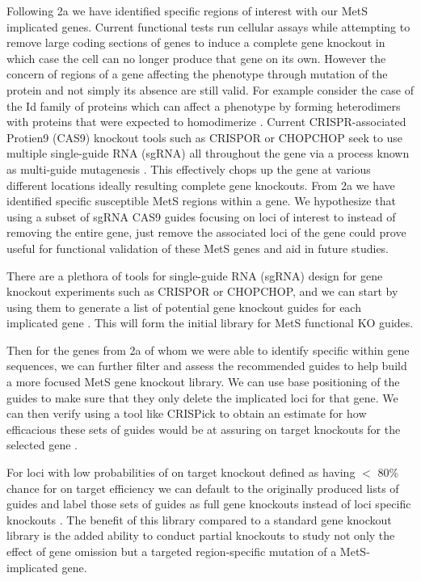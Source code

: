 \documentclass[11pt]{article}
\begin{document}
\noindent {}

Following 2a we have identified specific regions of interest with our MetS implicated genes. Current functional tests run cellular assays while attempting to remove large coding sections of genes to induce a complete gene knockout in which case the cell can no longer produce that gene on its own. However the concern of regions of a gene affecting the phenotype through mutation of the protein and not simply its absence are still valid. For example consider the case of the Id family of proteins which can affect a phenotype by forming heterodimers with proteins that were expected to homodimerize \cite{Perk2005}. Current CRISPR-associated Protien9 (CAS9) knockout tools such as CRISPOR or CHOPCHOP seek to use multiple single-guide RNA (sgRNA) all throughout the gene via a process known as multi-guide mutagenesis \cite{Concordet2018-nl,Labun2019-ed,Ma2014-uc}. This effectively chops up the gene at various different locations ideally resulting complete gene knockouts. From 2a we have identified specific susceptible MetS regions within a gene. We hypothesize that using a subset of sgRNA CAS9 guides focusing on loci of interest to instead of removing the entire gene, just remove the associated loci of the gene could prove useful for functional validation of these MetS genes and aid in future studies.

\noindent {}

There are a plethora of tools for single-guide RNA (sgRNA) design for gene knockout experiments such as CRISPOR or CHOPCHOP, and we can start by using them to generate a list of potential gene knockout guides for each implicated gene \cite{Concordet2018-nl,Labun2019-ed}. This will form the initial library for MetS functional KO guides.

Then for the genes from 2a of whom we were able to identify specific within gene sequences, we can further filter and assess the recommended guides to help build a more focused MetS gene knockout library. We can use base positioning of the guides to make sure that they only delete the implicated loci for that gene. We can then verify using a tool like CRISPick to obtain an estimate for how efficacious these sets of guides would be at assuring on target knockouts for the selected gene \cite{Doench2016-jx}. 

For loci with low probabilities of on target knockout defined as having $<$ 80\% chance for on target efficiency we can default to the originally produced lists of guides and label those sets of guides as full gene knockouts instead of loci specific knockouts \cite{Doench2016-jx}. The benefit of this library compared to a standard gene knockout library is the added ability to conduct partial knockouts to study not only the effect of gene omission but a targeted region-specific mutation of a MetS-implicated gene.
\end{document}
